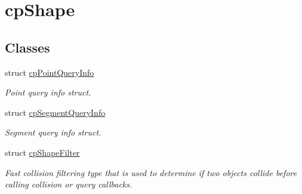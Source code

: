 \hypertarget{group__cpShape}{}\section{cp\+Shape}
\label{group__cpShape}
\subsection*{Classes}
\begin{DoxyCompactItemize}
\item 
struct \hyperlink{structcpPointQueryInfo}{cp\+Point\+Query\+Info}
\begin{DoxyCompactList}\small\item\em Point query info struct. \end{DoxyCompactList}\item 
struct \hyperlink{structcpSegmentQueryInfo}{cp\+Segment\+Query\+Info}
\begin{DoxyCompactList}\small\item\em Segment query info struct. \end{DoxyCompactList}\item 
struct \hyperlink{structcpShapeFilter}{cp\+Shape\+Filter}
\begin{DoxyCompactList}\small\item\em Fast collision filtering type that is used to determine if two objects collide before calling collision or query callbacks. \end{DoxyCompactList}\end{DoxyCompactItemize}
